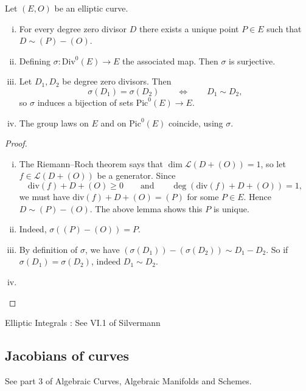 \begin{proposition}
    Let $(E, O)$ be an elliptic curve.
    \begin{enumerate}[(i)]
        \item For every degree zero divisor $D$ there exists a unique point $P \in E$ such that $D \sim{} (P) - (O)$.
        
        \item Defining $\sigma : \text{Div}^0(E) \to E$ the associated map. Then $\sigma$ is surjective.
        
        \item Let $D_1, D_2$ be degree zero divisors. Then
        \[ \sigma(D_1) = \sigma(D_2) \qquad \iff \qquad D_1 \sim{} D_2 , \]
        so $\sigma$ induces a bijection of sets $\text{Pic}^0(E) \to E$.
        
        \item The group laws on $E$ and on $\text{Pic}^0(E)$ coincide, using $\sigma$.
    \end{enumerate}
\end{proposition}
\begin{proof}
    \begin{enumerate}[(i)]
        \item The Riemann--Roch theorem says that $\dim \mathcal{L}(D + (O)) = 1$, so let $f \in \mathcal{L}(D + (O))$ be a generator. Since
        \[ \text{div}(f) + D + (O) \ge 0 \qquad \text{and} \qquad \deg(\text{div}(f) + D + (O)) = 1, \]
        we must have $\text{div}(f) + D + (O) = (P)$ for some $P \in E$. Hence $D \sim{} (P) - (O)$. The above lemma shows this $P$ is unique.
        
        \item Indeed, $\sigma((P) - (O)) = P$.
        
        \item By definition of $\sigma$, we have $(\sigma(D_1)) - (\sigma(D_2)) \sim{} D_1 - D_2$. So if $\sigma(D_1) = \sigma(D_2)$, indeed $D_1 \sim{} D_2$.
        
        \item {}
    \end{enumerate}
\end{proof}




Elliptic Integrals : See VI.1 of Silvermann


















\subsection{Jacobians of curves}

See part 3 of Algebraic Curves, Algebraic Manifolds and Schemes.